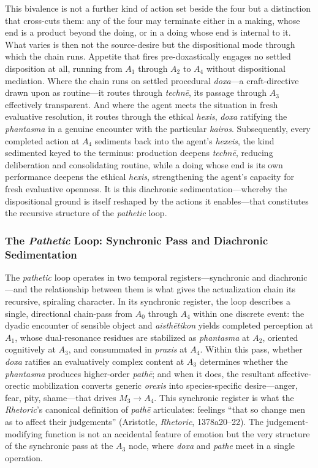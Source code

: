 \documentclass{article}
\begin{document}
This bivalence is not a further kind of action set beside the four but a distinction that cross-cuts them: any of the four may terminate either in a making, whose end is a product beyond the doing, or in a doing whose end is internal to it. What varies is then not the source-desire but the dispositional mode through which the chain runs. Appetite that fires pre-doxastically engages no settled disposition at all, running from $A_1$ through $A_2$ to $A_4$ without dispositional mediation. Where the chain runs on settled procedural \textit{doxa}---a craft-directive drawn upon as routine---it routes through \textit{technē}, its passage through $A_3$ effectively transparent. And where the agent meets the situation in fresh evaluative resolution, it routes through the ethical \textit{hexis}, \textit{doxa} ratifying the \textit{phantasma} in a genuine encounter with the particular \textit{kairos}. Subsequently, every completed action at $A_4$ sediments back into the agent's \textit{hexeis}, the kind sedimented keyed to the terminus: production deepens \textit{technē}, reducing deliberation and consolidating routine, while a doing whose end is its own performance deepens the ethical \textit{hexis}, strengthening the agent's capacity for fresh evaluative openness. It is this diachronic sedimentation---whereby the dispositional ground is itself reshaped by the actions it enables---that constitutes the recursive structure of the \textit{pathetic} loop.


\subsubsection*{The \textit{Pathetic} Loop: Synchronic Pass and Diachronic Sedimentation}

The \textit{pathetic} loop operates in two temporal registers---synchronic and diachronic---and the relationship between them is what gives the actualization chain its recursive, spiraling character. In its synchronic register, the loop describes a single, directional chain-pass from $A_0$ through $A_4$ within one discrete event: the dyadic encounter of sensible object and \textit{aisthētikon} yields completed perception at $A_1$, whose dual-resonance residues are stabilized as \textit{phantasma} at $A_2$, oriented cognitively at $A_3$, and consummated in \textit{praxis} at $A_4$. Within this pass, whether \textit{doxa} ratifies an evaluatively complex content at $A_3$ determines whether the \textit{phantasma} produces higher-order \textit{pathē}; and when it does, the resultant affective-orectic mobilization converts generic \textit{orexis} into species-specific desire---anger, fear, pity, shame---that drives $M_3 \rightarrow A_4$. This synchronic register is what the \textit{Rhetoric}'s canonical definition of \textit{pathē} articulates: feelings ``that so change men as to affect their judgements'' (Aristotle, \textit{Rhetoric}, 1378a20--22). The judgement-modifying function is not an accidental feature of emotion but the very structure of the synchronic pass at the $A_3$ node, where \textit{doxa} and \textit{pathe} meet in a single operation.
\end{document}
